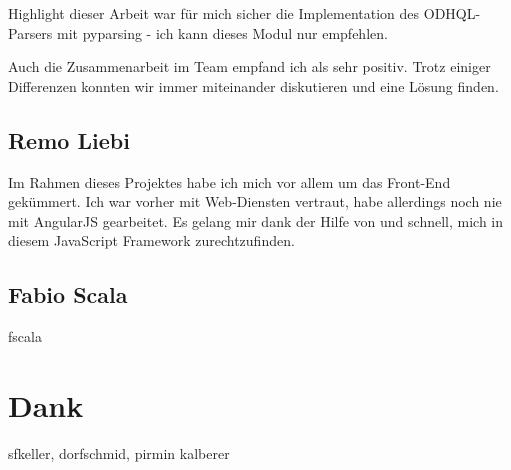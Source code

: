 Highlight dieser Arbeit war für mich sicher die Implementation des ODHQL-Parsers mit pyparsing - ich kann dieses Modul nur empfehlen. 

Auch die Zusammenarbeit im Team empfand ich als sehr positiv. Trotz einiger Differenzen konnten wir immer miteinander diskutieren und eine Lösung finden. 

\subsection{Remo Liebi}
Im Rahmen dieses Projektes habe ich mich vor allem um das Front-End gekümmert. Ich war vorher mit Web-Diensten vertraut, habe allerdings noch nie mit AngularJS gearbeitet. Es gelang mir dank der Hilfe von \fscf und \chuf schnell, mich in diesem JavaScript Framework zurechtzufinden.

\subsection{Fabio Scala}
\xxx fscala


\section{Dank}
\xxx sfkeller, dorfschmid, pirmin kalberer
